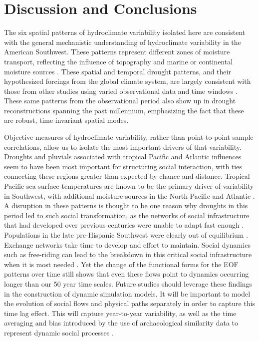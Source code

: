 \documentclass[10pt]{iopart}
\begin{document}
\section*{Discussion and Conclusions}

The six spatial patterns of hydroclimate variability isolated here are consistent with the general mechanistic understanding of hydroclimate variability in the American Southwest. These patterns represent different zones of moisture transport, reflecting the influence of topography and marine or continental moisture sources \parencite{Liu2010, Hu2011}. These spatial and temporal drought patterns, and their hypothesized forcings from the global climate system, are largely consistent with those from other studies using varied observational data and time windows \parencite{Comrie1999,Cook1999,McCabe1999,McCabe2004,Ryu2010,Seager2014,Herrmann2016}. These same patterns from the observational period also show up in drought reconstructions spanning the past millennium, emphasizing the fact that these are robust, time invariant spatial modes.

Objective measures of hydroclimate variability, rather than point-to-point sample correlations, allow us to isolate the most important drivers of that variability. Droughts and pluvials associated with tropical Pacific and Atlantic influences seem to have been most important for structuring social interaction, with ties connecting these regions greater than expected by chance and distance. Tropical Pacific sea surface temperatures are known to be the primary driver of variability in Southwest, with additional moisture sources in the North Pacific and Atlantic \parencite{McCabe2004}. A disruption in these patterns is thought to be one reason why droughts in this period led to such social transformation, as the networks of social infrastructure that had developed over previous centuries were unable to adapt fast enough \parencite{Cordell2007}. Populations in the late pre-Hispanic Southwest were clearly out of equilibrium \parencite{Hill2004}. Exchange networks take time to develop and effort to maintain. Social dynamics such as free-riding can lead to the breakdown in this critical social infrastructure when it is most needed \parencite{Kohler1996}. Yet the change of the functional forms for the EOF patterns over time still shows that even these flows point to dynamics occurring longer than our 50 year time scales. Future studies should leverage these findings in the construction of dynamic simulation models. It will be important to model the evolution of social flows and physical paths separately \parencite{Bevan2013} in order to capture this time lag effect. This will capture year-to-year variability, as well as the time averaging and bias introduced by the use of archaeological similarity data to represent dynamic social processes \parencite{Crema2014}. 
\end{document}
